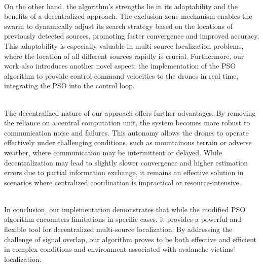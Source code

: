 \documentclass[main]{subfiles}
\begin{document}
\noindent\\
On the other hand, the algorithm's strengths lie in its adaptability and
the benefits of a decentralized approach. The exclusion zone mechanism
enables the swarm to dynamically adjust its search strategy based on the
locations of previously detected sources, promoting faster convergence
and improved accuracy. This adaptability is especially valuable in
multi-source localization problems, where the location of all different
sources rapidly is crucial.
Furthermore, our work also introduces another novel aspect: 
the implementation of the PSO algorithm to provide control command velocities 
to the drones in real time, integrating the PSO into the control
loop.

\noindent\\
The decentralized nature of our approach offers further advantages. By
removing the reliance on a central computation unit, the system becomes
more robust to communication noise and failures. This autonomy allows
the drones to operate effectively under challenging conditions, such as
mountainous terrain or adverse weather, where communication may be
intermittent or delayed. While decentralization may lead to slightly
slower convergence and higher estimation errors due to partial
information exchange, it remains an effective solution in scenarios
where centralized coordination is impractical or resource-intensive.

\noindent\\
In conclusion, our implementation demonstrates that while the modified PSO
algorithm encounters limitations in specific cases, it provides a
powerful and flexible tool for decentralized multi-source localization.
By addressing the challenge of signal overlap, our algorithm proves to be
both effective and efficient in complex conditions and environment-associated
with avalanche victims' localization.
\end{document}
